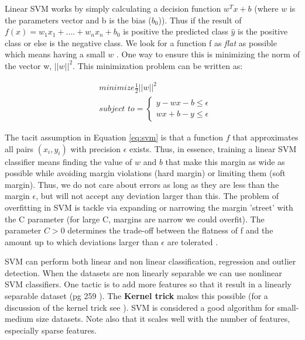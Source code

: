 \documentclass[11pt]{article}
\theoremstyle{definition}
\theoremstyle{remark}
\begin{document}
Linear SVM works by simply calculating a decision function $w^Tx +b$ (where $w$ is the parameters vector and b is the bias ($b_0$)). Thus if the result of $f(x) = w_{1} x_{1} + ....+ w_{n}x_{n} + b_0$ is positive the predicted class $\hat{y}$ is the positive class or else is the negative class. We look for a function f as \emph{flat} as possible which means having a small $w$ . One way to ensure this is minimizing the norm of the vector w, $||w||^2$. This minimization problem can be written as:

\begin{equation}\label{eq:svm}
\begin{aligned}
 & \textit{minimize} \frac{1}{2} ||w||^2 \\
 & \textit{subject to}=
 \begin{cases}
    y - wx -b \leq \epsilon \\
    wx +b - y \leq \epsilon
  \end{cases}
  \end{aligned}
\end{equation}

The tacit assumption in Equation \ref{eq:svm} is that a function $f$ that approximates all pairs $(x_i, y_i)$ with precision $\epsilon$ exists.
Thus, in essence, training a linear SVM classifier means finding the value of $w$ and $b$ that make this margin as wide as possible while avoiding margin violations (hard margin) or limiting them (soft margin). Thus, we do not care about errors as long as they are less than the margin $\epsilon$, but will not accept any deviation larger than this. 
The problem of overfitting in SVM is tackle via expanding or narrowing the margin 'street' with the C parameter (for large C, margins are narrow we could overfit). The parameter $C > 0$ determines the trade-off between the flatness of f and the amount up to which deviations larger than $\epsilon$ are tolerated \cite{smola2004tutorial}. 


SVM can perform both linear and non linear classification, regression and outlier detection. When the datasets are non linearly separable we can use nonlinear SVM classifiers. One tactic is to add more features so that it result in a linearly separable dataset (pg 259 \cite{geron2017hands}). The \textbf{Kernel trick} makes this possible (for a discussion of the kernel trick see \cite{vapnik2013nature}). SVM is considered a good algorithm for small-medium size datasets. Note also that it scales well with the number of features, especially sparse features. 
\end{document}
